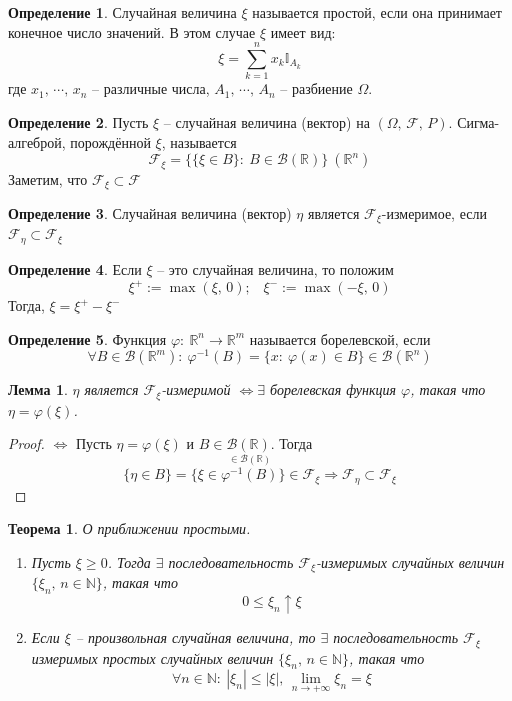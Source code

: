 \documentclass[a4paper,12pt]{article}
\renewcommand{\phi}{\ensuremath{\varphi}}
\renewcommand{\leq}{\ensuremath{\leqslant}}
\renewcommand{\geq}{\ensuremath{\geqslant}}
\theoremstyle{plain}
\newtheorem{theorem}{Теорема}[section]
\newtheorem{lemma}{Лемма}[section]
\theoremstyle{definition}
\newtheorem{definition}{Определение}[section]
\theoremstyle{remark}
\begin{document}
\begin{definition}
  Случайная величина $\xi$ называется простой, если она принимает конечное число значений. В этом случае $\xi$ имеет вид:
  \[\xi = \sum_{k = 1}^n x_k \mathbb{I}_{A_k}\]
  где $x_1,\,\cdots,\,x_n$ -- различные числа, $A_1,\,\cdots,\,A_n$ -- разбиение $\Omega$.
\end{definition}

\begin{definition}
  Пусть $\xi$ -- случайная величина (вектор) на $(\Omega,\, \mathcal{F},\,P)$. Сигма-алгеброй, порождённой $\xi$, называется 
  \[\mathcal{F}_\xi = \{\{\xi \in B\} :\: B \in \mathcal{B}(\mathbb{R})\} \: (\mathbb{R}^n)\]
  Заметим, что $\mathcal{F}_\xi \subset \mathcal{F}$
\end{definition}

\begin{definition}
  Случайная величина (вектор) $\eta$ является $\mathcal{F}_\xi$-измеримое, если $\mathcal{F}_\eta \subset \mathcal{F}_\xi$
\end{definition}

\begin{definition}
  Если $\xi$ -- это случайная величина, то положим
  \[\xi^+ := \max(\xi,\, 0);\;\;\; \xi^- := \max(-\xi,\, 0)\]
  Тогда, $\xi = \xi^+ - \xi^-$
\end{definition}

\begin{definition}
  Функция $\phi:\: \mathbb{R}^n \to \mathbb{R}^m$ называется борелевской, если 
  \[\forall B \in \mathcal{B}(\mathbb{R}^m) :\: \phi^{-1}(B) = \{x :\: \phi(x) \in B\} \in \mathcal{B}(\mathbb{R}^n)\]
\end{definition}

\begin{lemma} \label{BOREL_MEASURE}
  $\eta$ является $\mathcal{F}_\xi$-измеримой $\Leftrightarrow \exists$ борелевская функция $\phi$, такая что $\eta = \phi(\xi)$.
\end{lemma}

\begin{proof}
  $\Leftrightarrow$ Пусть $\eta = \phi(\xi)$ и $B \in \mathcal{B}(\mathbb{R})$. Тогда
  \[\{\eta \in B\} = \{\xi \in \stackrel{\in \mathcal{B}(\mathbb{R})}{\phi^{-1}(B)}\} \in \mathcal{F}_\xi \Rightarrow \mathcal{F}_\eta \subset \mathcal{F}_\xi\]
\end{proof}

\begin{theorem}
  О приближении простыми.
  
  \begin{enumerate}
    \item Пусть $\xi \geq 0$. Тогда $\exists$ последовательность $\mathcal{F}_\xi$-измеримых случайных величин $\{\xi_n,\, n \in \mathbb{N}\}$, такая что 
    \[0 \leq \xi_n \uparrow \xi\]
    \item Если $\xi$ -- произвольная случайная величина, то $\exists$ последовательность $\mathcal{F}_\xi$ измеримых простых случайных величин $\{\xi_n,\, n \in \mathbb{N}\}$, такая что
    \[\forall n \in \mathbb{N}:\: |\xi_n| \leq |\xi|,\, \lim_{n \to +\infty}\xi_n = \xi\]
  \end{enumerate}
\end{theorem}
\end{document}
